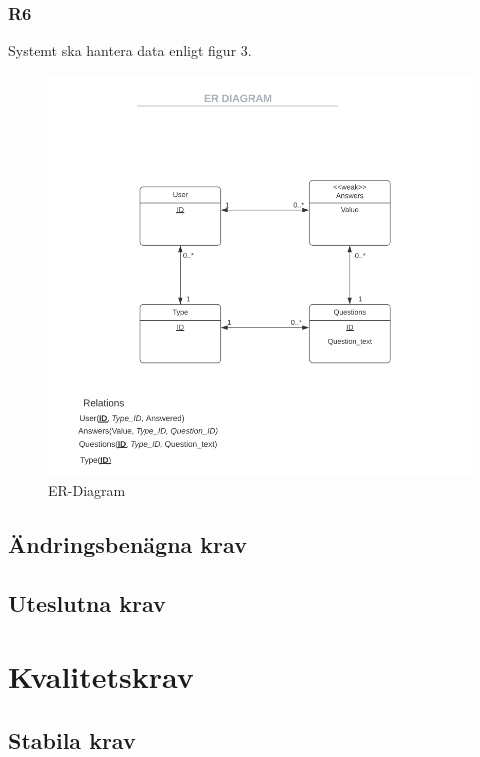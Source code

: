 \documentclass{article}
\begin{document}
    \newpage
    \subsubsection*{R6}
    Systemt ska hantera data enligt figur 3.
       \begin{figure}[h!]
    
    \includegraphics[width=150mm]{ERDIAGRAM.png}
    \caption{ER-Diagram}
    \end{figure}
    
    \newpage
    \subsection*{Ändringsbenägna krav}
    \subsection*{Uteslutna krav}
    
  
   
    \section{Kvalitetskrav}
    \subsection*{Stabila krav}
  
\end{document}
